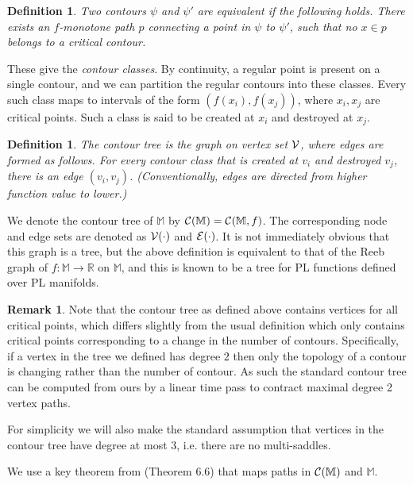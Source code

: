 \documentclass[11pt]{article}
\newtheorem{definition}[theorem]{Definition}
\theoremstyle{definition}
\newtheorem{remark}{Remark}
\newcommand{\cC}{{\cal C}}
\newcommand{\cE}{{\cal E}}
\newcommand{\cV}{{\cal V}}
\newcommand{\MM}{\mathbb{M}}
\newcommand{\RR}{\mathbb{R}}
\newcommand{\reeb}{\cC}
\begin{document}
\begin{definition} \label{def:equiv} Two contours $\psi$ and $\psi'$ are equivalent 
if the following holds. There exists an $f$-monotone path $p$ connecting a point in $\psi$ to $\psi'$,
such that no $x \in p$ belongs to a critical contour.
\end{definition}

These give the \emph{contour classes}. By continuity, a regular point is present on a single contour,
and we can partition the regular contours into these classes. Every such class maps to intervals
of the form $(f(x_i),f(x_j))$, where $x_i, x_j$ are critical points. Such a class is said
to be created at $x_i$ and destroyed at $x_j$. 

\begin{definition} \label{def:tree} The contour tree is the graph on vertex set $\cV$, where
edges are formed as follows. For every contour class that is created at $v_i$ and destroyed $v_j$,
there is an edge $(v_i,v_j)$. (Conventionally, edges are directed from higher function value to lower.)
\end{definition}

We denote the contour tree of $\MM$
by $\reeb(\MM) = \reeb(\MM,f)$. The corresponding node and edge sets are denoted as $\cV(\cdot)$ and $\cE(\cdot)$.
%
It is not immediately obvious that this graph is a tree, but the above definition is equivalent to that of the Reeb graph of $f:\MM \rightarrow \RR$ on $\MM$, and this is known to be a tree for PL functions defined over PL manifolds.  

\begin{remark}
Note that the contour tree as defined above contains vertices for all critical points, 
which differs slightly from the usual definition which only contains critical points corresponding to a change in the number of contours.  Specifically, if a vertex in the tree we defined has degree $2$ then only the topology of a contour is changing rather than the number of contour.  As such the standard contour tree can be computed from ours by a linear time pass to contract maximal degree 2 vertex paths.

For simplicity we will also make the standard assumption that vertices in the contour 
tree have degree at most $3$, i.e. there are no multi-saddles.
\end{remark}


We use a key theorem from \cite{c-tmi-04} (Theorem 6.6) that maps paths in $\cC(\MM)$ and $\MM$.
\end{document}
